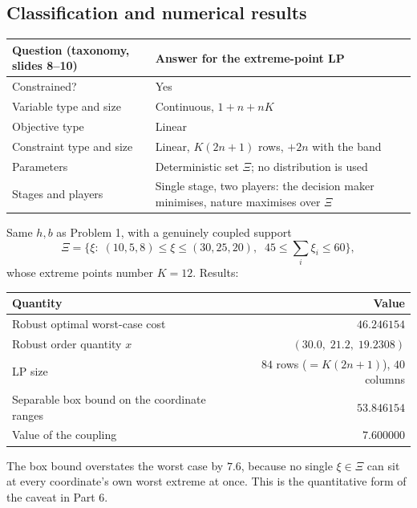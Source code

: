 \documentclass[11pt]{article}
\theoremstyle{definition}
\begin{document}
\subsection*{Classification and numerical results}

\begin{center}
\begin{tabular}{@{}ll@{}}
\toprule
Question (taxonomy, slides 8--10) & Answer for the extreme-point LP \\
\midrule
Constrained?             & Yes \\
Variable type and size   & Continuous, $1+n+nK$ \\
Objective type           & Linear \\
Constraint type and size & Linear, $K(2n+1)$ rows, $+2n$ with the band \\
Parameters               & Deterministic set $\Xi$; no distribution is used \\
Stages and players       & Single stage, two players: the decision maker
                           minimises, nature maximises over $\Xi$ \\
\bottomrule
\end{tabular}
\end{center}

Same $h, b$ as Problem 1, with a genuinely coupled support
\[
  \Xi = \Big\{ \xi :\; (10,5,8) \le \xi \le (30,25,20), \;\;
    45 \le \textstyle\sum_i \xi_i \le 60 \Big\},
\]
whose extreme points number $K = 12$. Results:

\begin{center}
\begin{tabular}{@{}lr@{}}
\toprule
Quantity & Value \\
\midrule
Robust optimal worst-case cost & $46.246154$ \\
Robust order quantity $x$ & $(30.0,\; 21.2,\; 19.2308)$ \\
LP size & $84$ rows ($=K(2n+1)$), $40$ columns \\
Separable box bound on the coordinate ranges & $53.846154$ \\
Value of the coupling & $7.600000$ \\
\bottomrule
\end{tabular}
\end{center}

The box bound overstates the worst case by $7.6$, because no single
$\xi\in\Xi$ can sit at every coordinate's own worst extreme at once. This
is the quantitative form of the caveat in Part 6.
\end{document}
